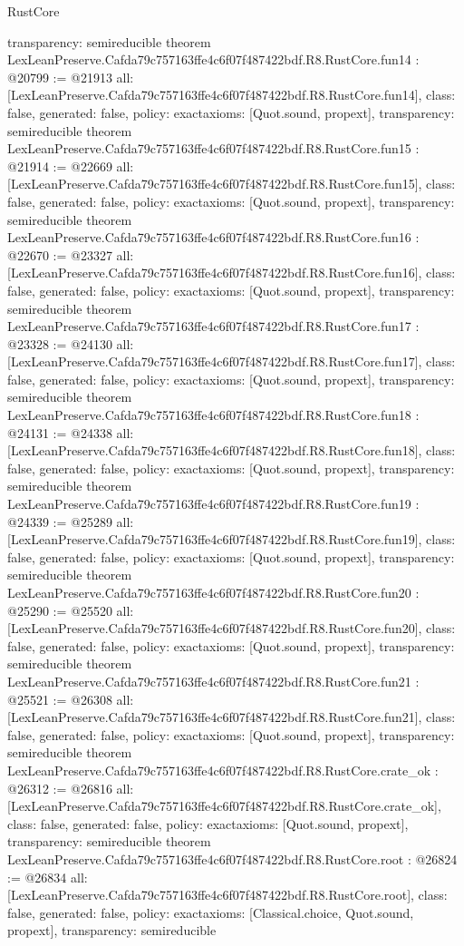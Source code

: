 \begin{lexlean}{RustCore}
\begin{coremodule}
{  transparency: semireducible
}
theorem LexLeanPreserve.Cafda79c757163ffe4c6f07f487422bdf.R8.RustCore.fun14 : @20799 := @21913 {
  all: [LexLeanPreserve.Cafda79c757163ffe4c6f07f487422bdf.R8.RustCore.fun14],
  class: false,
  generated: false,
  policy: exact{axioms: [Quot.sound, propext]},
  transparency: semireducible
}
theorem LexLeanPreserve.Cafda79c757163ffe4c6f07f487422bdf.R8.RustCore.fun15 : @21914 := @22669 {
  all: [LexLeanPreserve.Cafda79c757163ffe4c6f07f487422bdf.R8.RustCore.fun15],
  class: false,
  generated: false,
  policy: exact{axioms: [Quot.sound, propext]},
  transparency: semireducible
}
theorem LexLeanPreserve.Cafda79c757163ffe4c6f07f487422bdf.R8.RustCore.fun16 : @22670 := @23327 {
  all: [LexLeanPreserve.Cafda79c757163ffe4c6f07f487422bdf.R8.RustCore.fun16],
  class: false,
  generated: false,
  policy: exact{axioms: [Quot.sound, propext]},
  transparency: semireducible
}
theorem LexLeanPreserve.Cafda79c757163ffe4c6f07f487422bdf.R8.RustCore.fun17 : @23328 := @24130 {
  all: [LexLeanPreserve.Cafda79c757163ffe4c6f07f487422bdf.R8.RustCore.fun17],
  class: false,
  generated: false,
  policy: exact{axioms: [Quot.sound, propext]},
  transparency: semireducible
}
theorem LexLeanPreserve.Cafda79c757163ffe4c6f07f487422bdf.R8.RustCore.fun18 : @24131 := @24338 {
  all: [LexLeanPreserve.Cafda79c757163ffe4c6f07f487422bdf.R8.RustCore.fun18],
  class: false,
  generated: false,
  policy: exact{axioms: [Quot.sound, propext]},
  transparency: semireducible
}
theorem LexLeanPreserve.Cafda79c757163ffe4c6f07f487422bdf.R8.RustCore.fun19 : @24339 := @25289 {
  all: [LexLeanPreserve.Cafda79c757163ffe4c6f07f487422bdf.R8.RustCore.fun19],
  class: false,
  generated: false,
  policy: exact{axioms: [Quot.sound, propext]},
  transparency: semireducible
}
theorem LexLeanPreserve.Cafda79c757163ffe4c6f07f487422bdf.R8.RustCore.fun20 : @25290 := @25520 {
  all: [LexLeanPreserve.Cafda79c757163ffe4c6f07f487422bdf.R8.RustCore.fun20],
  class: false,
  generated: false,
  policy: exact{axioms: [Quot.sound, propext]},
  transparency: semireducible
}
theorem LexLeanPreserve.Cafda79c757163ffe4c6f07f487422bdf.R8.RustCore.fun21 : @25521 := @26308 {
  all: [LexLeanPreserve.Cafda79c757163ffe4c6f07f487422bdf.R8.RustCore.fun21],
  class: false,
  generated: false,
  policy: exact{axioms: [Quot.sound, propext]},
  transparency: semireducible
}
theorem LexLeanPreserve.Cafda79c757163ffe4c6f07f487422bdf.R8.RustCore.crate_ok : @26312 := @26816 {
  all: [LexLeanPreserve.Cafda79c757163ffe4c6f07f487422bdf.R8.RustCore.crate_ok],
  class: false,
  generated: false,
  policy: exact{axioms: [Quot.sound, propext]},
  transparency: semireducible
}
theorem LexLeanPreserve.Cafda79c757163ffe4c6f07f487422bdf.R8.RustCore.root : @26824 := @26834 {
  all: [LexLeanPreserve.Cafda79c757163ffe4c6f07f487422bdf.R8.RustCore.root],
  class: false,
  generated: false,
  policy: exact{axioms: [Classical.choice, Quot.sound, propext]},
  transparency: semireducible
}


\end{coremodule}
\end{lexlean}
